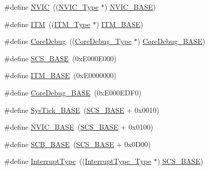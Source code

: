 \begin{DoxyCompactItemize}
\item 
\#define \hyperlink{group___c_m_s_i_s___c_m3__core__register_gac8e97e8ce56ae9f57da1363a937f8a17}{N\+V\+IC}~((\hyperlink{struct_n_v_i_c___type}{N\+V\+I\+C\+\_\+\+Type} $\ast$)          \hyperlink{openmotestm_2library_2inc_2stm32f10x__map_8h_aa0288691785a5f868238e0468b39523d}{N\+V\+I\+C\+\_\+\+B\+A\+SE})
\item 
\#define \hyperlink{group___c_m_s_i_s___c_m3__core__register_gabae7cdf882def602cb787bb039ff6a43}{I\+TM}~((\hyperlink{struct_i_t_m___type}{I\+T\+M\+\_\+\+Type} $\ast$)           \hyperlink{group___c_m_s_i_s___c_m3__core__register_gadd76251e412a195ec0a8f47227a8359e}{I\+T\+M\+\_\+\+B\+A\+SE})
\item 
\#define \hyperlink{group___c_m_s_i_s___c_m3__core__register_gab6e30a2b802d9021619dbb0be7f5d63d}{Core\+Debug}~((\hyperlink{struct_core_debug___type}{Core\+Debug\+\_\+\+Type} $\ast$)     \hyperlink{group___c_m_s_i_s___c_m3__core__register_ga680604dbcda9e9b31a1639fcffe5230b}{Core\+Debug\+\_\+\+B\+A\+SE})
\item 
\#define \hyperlink{group___c_m_s_i_s___c_m3__core__register_ga3c14ed93192c8d9143322bbf77ebf770}{S\+C\+S\+\_\+\+B\+A\+SE}~(0x\+E000\+E000)
\item 
\#define \hyperlink{group___c_m_s_i_s___c_m3__core__register_gadd76251e412a195ec0a8f47227a8359e}{I\+T\+M\+\_\+\+B\+A\+SE}~(0x\+E0000000)
\item 
\#define \hyperlink{group___c_m_s_i_s___c_m3__core__register_ga680604dbcda9e9b31a1639fcffe5230b}{Core\+Debug\+\_\+\+B\+A\+SE}~(0x\+E000\+E\+D\+F0)
\item 
\#define \hyperlink{group___c_m_s_i_s___c_m3__core__register_ga58effaac0b93006b756d33209e814646}{Sys\+Tick\+\_\+\+B\+A\+SE}~(\hyperlink{openmotestm_2library_2inc_2stm32f10x__map_8h_a3c14ed93192c8d9143322bbf77ebf770}{S\+C\+S\+\_\+\+B\+A\+SE} +  0x0010)
\item 
\#define \hyperlink{group___c_m_s_i_s___c_m3__core__register_gaa0288691785a5f868238e0468b39523d}{N\+V\+I\+C\+\_\+\+B\+A\+SE}~(\hyperlink{openmotestm_2library_2inc_2stm32f10x__map_8h_a3c14ed93192c8d9143322bbf77ebf770}{S\+C\+S\+\_\+\+B\+A\+SE} +  0x0100)
\item 
\#define \hyperlink{group___c_m_s_i_s___c_m3__core__register_gad55a7ddb8d4b2398b0c1cfec76c0d9fd}{S\+C\+B\+\_\+\+B\+A\+SE}~(\hyperlink{openmotestm_2library_2inc_2stm32f10x__map_8h_a3c14ed93192c8d9143322bbf77ebf770}{S\+C\+S\+\_\+\+B\+A\+SE} +  0x0\+D00)
\item 
\#define \hyperlink{group___c_m_s_i_s___c_m3__core__register_ga164238adbad56f07c7dd4e912af748dd}{Interrupt\+Type}~((\hyperlink{struct_interrupt_type___type}{Interrupt\+Type\+\_\+\+Type} $\ast$) \hyperlink{openmotestm_2library_2inc_2stm32f10x__map_8h_a3c14ed93192c8d9143322bbf77ebf770}{S\+C\+S\+\_\+\+B\+A\+SE})

\end{DoxyCompactItemize}
